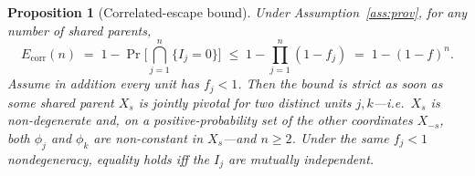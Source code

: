 \documentclass[11pt]{article}
\newtheorem{proposition}{Proposition}
\theoremstyle{definition}
\theoremstyle{remark}
\newcommand{\Esc}{E}
\newcommand{\fesc}{f}
\begin{document}
\begin{proposition}[Correlated-escape bound]\label{prop:corr}
Under Assumption~\ref{ass:prov}, for \emph{any} number of shared parents,
\begin{equation}\label{eq:corr}
\Esc_{\mathrm{corr}}(n)\;=\;1-\Pr\!\Big[\textstyle\bigcap_{j=1}^{n}\{I_j=0\}\Big]
\;\le\;1-\prod_{j=1}^{n}(1-\fesc_j)\;=\;1-(1-\fesc)^n.
\end{equation}
Assume in addition every unit has $\fesc_j<1$. Then the bound is strict as soon as some shared parent
$X_s$ is \emph{jointly pivotal} for two distinct units $j,k$---i.e.\ $X_s$ is non-degenerate and, on a
positive-probability set of the other coordinates $X_{-s}$, both $\phi_j$ and $\phi_k$ are non-constant
in $X_s$---and $n\ge2$. Under the same $\fesc_j<1$ nondegeneracy, equality holds \emph{iff} the $I_j$
are mutually independent.
\end{proposition}
\end{document}
